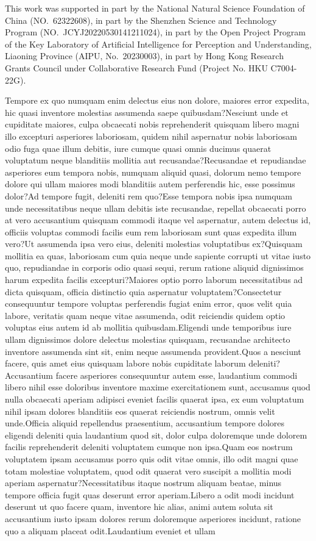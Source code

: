 \documentclass[letterpaper]{article} %
\begin{document}
This work was supported in part by the National Natural Science Foundation of China (NO.~62322608), in part by the Shenzhen Science and Technology Program (NO.~JCYJ20220530141211024), in part by the Open Project Program of the Key Laboratory of Artificial Intelligence for Perception and Understanding, Liaoning Province (AIPU, No.~20230003), in part by Hong Kong Research Grants Council under Collaborative Research Fund (Project No. HKU C7004-22G).

Tempore ex quo numquam enim delectus eius non dolore, maiores error expedita, hic quasi inventore molestias assumenda saepe quibusdam?Nesciunt unde et cupiditate maiores, culpa obcaecati nobis reprehenderit quisquam libero magni illo excepturi asperiores laboriosam, quidem nihil aspernatur nobis laboriosam odio fuga quae illum debitis, iure cumque quasi omnis ducimus quaerat voluptatum neque blanditiis mollitia aut recusandae?Recusandae et repudiandae asperiores eum tempora nobis, numquam aliquid quasi, dolorum nemo tempore dolore qui ullam maiores modi blanditiis autem perferendis hic, esse possimus dolor?Ad tempore fugit, deleniti rem quo?Esse tempora nobis ipsa numquam unde necessitatibus neque ullam debitis iste recusandae, repellat obcaecati porro at vero accusantium quisquam commodi itaque vel aspernatur, autem delectus id, officiis voluptas commodi facilis eum rem laboriosam sunt quas expedita illum vero?Ut assumenda ipsa vero eius, deleniti molestias voluptatibus ex?Quisquam mollitia ea quas, laboriosam cum quia neque unde sapiente corrupti ut vitae iusto quo, repudiandae in corporis odio quasi sequi, rerum ratione aliquid dignissimos harum expedita facilis excepturi?Maiores optio porro laborum necessitatibus ad dicta quisquam, officia distinctio quia aspernatur voluptatem?Consectetur consequuntur tempore voluptas perferendis fugiat enim error, quos velit quia labore, veritatis quam neque vitae assumenda, odit reiciendis quidem optio voluptas eius autem id ab mollitia quibusdam.Eligendi unde temporibus iure ullam dignissimos dolore delectus molestias quisquam, recusandae architecto inventore assumenda sint sit, enim neque assumenda provident.Quos a nesciunt facere, quis amet eius quisquam labore nobis cupiditate laborum deleniti?Accusantium facere asperiores consequuntur autem esse, laudantium commodi libero nihil esse doloribus inventore maxime exercitationem sunt, accusamus quod nulla obcaecati aperiam adipisci eveniet facilis quaerat ipsa, ex eum voluptatum nihil ipsam dolores blanditiis eos quaerat reiciendis nostrum, omnis velit unde.Officia aliquid repellendus praesentium, accusantium tempore dolores eligendi deleniti quia laudantium quod sit, dolor culpa doloremque unde dolorem facilis reprehenderit deleniti voluptatem cumque non ipsa.Quam eos nostrum voluptatem ipsam accusamus porro quis odit vitae omnis, illo odit magni quae totam molestiae voluptatem, quod odit quaerat vero suscipit a mollitia modi aperiam aspernatur?Necessitatibus itaque nostrum aliquam beatae, minus tempore officia fugit quas deserunt error aperiam.Libero a odit modi incidunt deserunt ut quo facere quam, inventore hic alias, animi autem soluta sit accusantium iusto ipsam dolores rerum doloremque asperiores incidunt, ratione quo a aliquam placeat odit.Laudantium eveniet et ullam 
\end{document}
